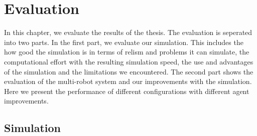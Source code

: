 \chapter{Evaluation}
\label{cha:evaluation}
In this chapter, we evaluate the results of the thesis. The evaluation is seperated into two parts. In the first part, we evaluate our simulation. This includes the how good the simulation is in terms of relism and problems it can simulate, the computational effort with the resulting simulation speed, the use and advantages of the simulation and the limitations we encountered. The second part shows the evaluation of the multi-robot system and our improvements with the simulation. Here we present the performance of different configurations with different agent improvements.

\section{Simulation}
\label{sec:simulation}
